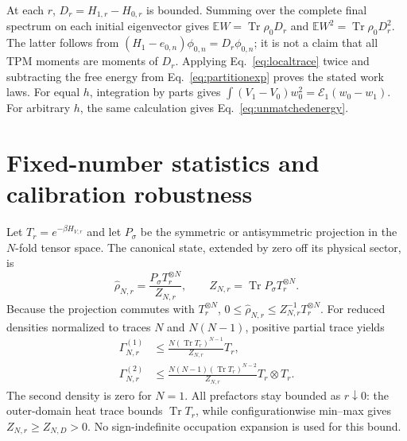 \documentclass[aps,pra,reprint,superscriptaddress,longbibliography]{revtex4-2}
\newcommand{\Tr}{\operatorname{Tr}}
\newcommand{\E}{\mathbb E}
\newcommand{\calE}{\mathcal E}
\begin{document}
At each $r$, $D_r=H_{1,r}-H_{0,r}$ is bounded. Summing over the complete final spectrum on each initial eigenvector gives $\E W=\Tr\rho_0D_r$ and $\E W^2=\Tr\rho_0D_r^2$. The latter follows from $(H_1-e_{0,n})\phi_{0,n}=D_r\phi_{0,n}$; it is not a claim that all TPM moments are moments of $D_r$. Applying Eq.~\eqref{eq:localtrace} twice and subtracting the free energy from Eq.~\eqref{eq:partitionexp} proves the stated work laws. For equal $h$, integration by parts gives $\int(V_1-V_0)w_0^2=\calE_1(w_0-w_1)$. For arbitrary $h$, the same calculation gives Eq.~\eqref{eq:unmatchedenergy}.

\section{Fixed-number statistics and calibration robustness}
\label{app:canonical}

Let $T_r=e^{-\beta H_{V,r}}$ and let $P_\sigma$ be the symmetric or antisymmetric projection in the $N$-fold tensor space. The canonical state, extended by zero off its physical sector, is
\begin{equation}
 \widehat\rho_{N,r}=\frac{P_\sigma T_r^{\otimes N}}{Z_{N,r}},
 \qquad Z_{N,r}=\Tr P_\sigma T_r^{\otimes N}.
 \label{eq:canonicalstate}
\end{equation}
Because the projection commutes with $T_r^{\otimes N}$,
$0\le\widehat\rho_{N,r}\le Z_{N,r}^{-1}T_r^{\otimes N}$.
For reduced densities normalized to traces $N$ and $N(N-1)$, positive partial trace yields
\begin{align}
 \Gamma^{(1)}_{N,r}&\le\frac{N(\Tr T_r)^{N-1}}{Z_{N,r}}T_r,\nonumber\\
 \Gamma^{(2)}_{N,r}&\le\frac{N(N-1)(\Tr T_r)^{N-2}}{Z_{N,r}}
                              T_r\otimes T_r.\label{eq:domination}
\end{align}
The second density is zero for $N=1$. All prefactors stay bounded as $r\downarrow0$: the outer-domain heat trace bounds $\Tr T_r$, while configurationwise min--max gives $Z_{N,r}\ge Z_{N,D}>0$. No sign-indefinite occupation expansion is used for this bound.
\end{document}
